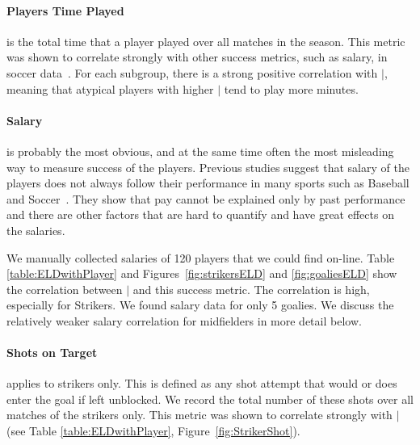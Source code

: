{	\paragraph{Players Time Played} is the total time that a player played over all matches in the season. This metric was shown to correlate strongly with other success metrics, such as salary, in soccer data~\citep{schwartz}. 
%	
%	
	For each subgroup, there is a strong positive correlation with $\mid$, meaning that atypical players with higher $\mid$ tend to play more minutes.
	
	\paragraph{Salary} is probably the most obvious, and at the same time often the most misleading way to measure success of the players. Previous studies suggest that salary of the players does not  always follow their performance in many sports such as Baseball and Soccer~\citep{Hall2002,Barrio2004}. They show that pay cannot be explained only by past performance and there are other factors that are hard to quantify and have great effects on the salaries. 
	
	 We manually collected salaries of 120 players that we could find on-line. Table \ref{table:ELDwithPlayer}  and Figures~\ref{fig:strikersELD} and \ref{fig:goaliesELD} show the correlation between $\mid$ and this success metric. The correlation is high, especially for Strikers. We found salary data for only 5 goalies. We discuss the relatively weaker salary correlation for midfielders in more detail below.
	 
	 \paragraph{Shots on Target} applies to strikers only. This is defined as any shot attempt that would or does enter the goal if left unblocked. We record the total number of these shots over all matches of the strikers only. This metric was shown to correlate strongly with $\mid$ (see Table \ref{table:ELDwithPlayer}, Figure~\ref{fig:StrikerShot}).
	 
}
